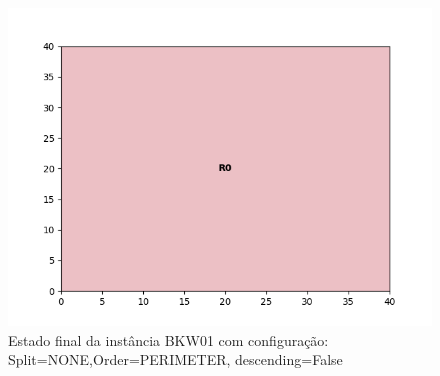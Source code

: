 \begin{figure}[H]
    \centering
    \caption[]{Estado final da instância BKW01 com configuração: Split=NONE,Order=PERIMETER, descending=False}
    \label{fig:bkw01-none-perimeter-false}
    \includegraphics[scale=0.5]{output/figures/bkw/bkw01/none/perimeter/false/00}
\end{figure}